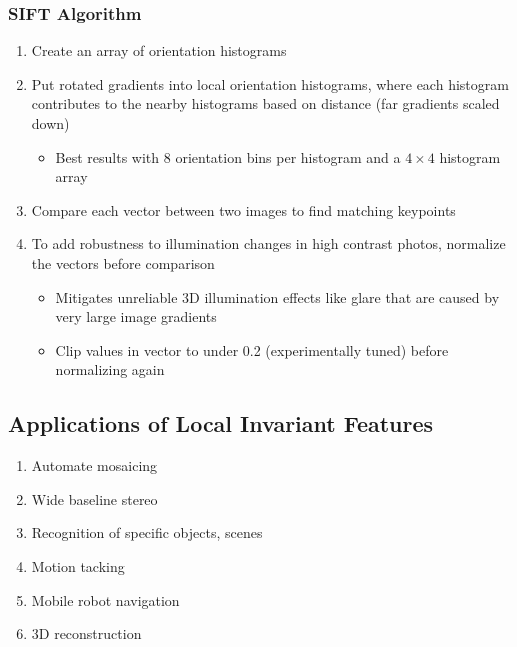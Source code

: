 \documentclass[letterpaper,12pt]{article}
\begin{document}
\subsubsection{SIFT Algorithm}
\begin{enumerate}
 \item Create an array of orientation histograms
 \item Put rotated gradients into local orientation histograms, where each histogram contributes to the nearby histograms based on distance (far gradients scaled down)
       \begin{itemize}
        \item Best results with 8 orientation bins per histogram and a $4 \times 4$ histogram array
       \end{itemize}
 \item Compare each vector between two images to find matching keypoints
 \item To add robustness to illumination changes in high contrast photos, normalize the vectors before comparison
       \begin{itemize}
        \item Mitigates unreliable 3D illumination effects like glare that are caused by very large image gradients
        \item Clip values in vector to under 0.2 (experimentally tuned) before normalizing again
       \end{itemize}
\end{enumerate}

\subsection{Applications of Local Invariant Features}
\begin{enumerate}
 \item Automate mosaicing
 \item Wide baseline stereo
 \item Recognition of specific objects, scenes
 \item Motion tacking
 \item Mobile robot navigation
 \item 3D reconstruction
\end{enumerate}
\end{document}
